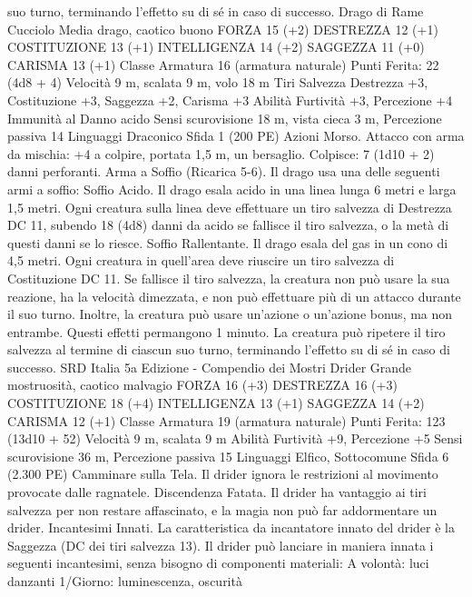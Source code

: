 \begin{multicols}{2}
suo turno, terminando l’effetto su di sé in caso di successo.
Drago di Rame Cucciolo
Media drago, caotico buono
FORZA 15 (+2)
DESTREZZA 12 (+1)
COSTITUZIONE 13 (+1)
INTELLIGENZA 14 (+2)
SAGGEZZA 11 (+0)
CARISMA 13 (+1)
Classe Armatura 16 (armatura naturale)
\hspace*{0pt}\hfill{Punti Ferita}: 22 (4d8 + 4)
Velocità 9 m, scalata 9 m, volo 18 m
Tiri Salvezza Destrezza +3, Costituzione +3, Saggezza +2, Carisma +3
Abilità Furtività +3, Percezione +4
Immunità al Danno acido
Sensi scurovisione 18 m, vista cieca 3 m, Percezione passiva 14
Linguaggi Draconico
Sfida 1 (200 PE)
Azioni
Morso. Attacco con arma da mischia: +4 a colpire, portata 1,5
m, un bersaglio.
Colpisce: 7 (1d10 + 2) danni perforanti.
Arma a Soffio (Ricarica 5-6). Il drago usa una delle seguenti armi
a soffio:
Soffio Acido. Il drago esala acido in una linea lunga 6 metri e larga
1,5 metri. Ogni creatura sulla linea deve effettuare un tiro salvezza di
Destrezza DC 11, subendo 18 (4d8) danni da acido se fallisce il tiro
salvezza, o la metà di questi danni se lo riesce.
Soffio Rallentante. Il drago esala del gas in un cono di 4,5 metri.
Ogni creatura in quell’area deve riuscire un tiro salvezza di
Costituzione DC 11. Se fallisce il tiro salvezza, la creatura non può
usare la sua reazione, ha la velocità dimezzata, e non può effettuare
più di un attacco durante il suo turno. Inoltre, la creatura può usare
un’azione o un’azione bonus, ma non entrambe. Questi effetti
permangono 1 minuto. La creatura può ripetere il tiro salvezza al
termine di ciascun suo turno, terminando l’effetto su di sé in caso di
successo.
SRD Italia 5a Edizione - Compendio dei Mostri
Drider
Grande mostruosità, caotico malvagio
FORZA 16 (+3)
DESTREZZA 16 (+3)
COSTITUZIONE 18 (+4)
INTELLIGENZA 13 (+1)
SAGGEZZA 14 (+2)
CARISMA 12 (+1)
Classe Armatura 19 (armatura naturale)
\hspace*{0pt}\hfill{Punti Ferita}: 123 (13d10 + 52)
Velocità 9 m, scalata 9 m
Abilità Furtività +9, Percezione +5
Sensi scurovisione 36 m, Percezione passiva 15
Linguaggi Elfico, Sottocomune
Sfida 6 (2.300 PE)
Camminare sulla Tela. Il drider ignora le restrizioni al
movimento provocate dalle ragnatele.
Discendenza Fatata. Il drider ha vantaggio ai tiri salvezza per
non restare affascinato, e la magia non può far addormentare un
drider.
Incantesimi Innati. La caratteristica da incantatore innato del
drider è la Saggezza (DC dei tiri salvezza 13). Il drider può
lanciare in maniera innata i seguenti incantesimi, senza bisogno
di componenti materiali:
A volontà: luci danzanti
1/Giorno: luminescenza, oscurità

\end{multicols}
